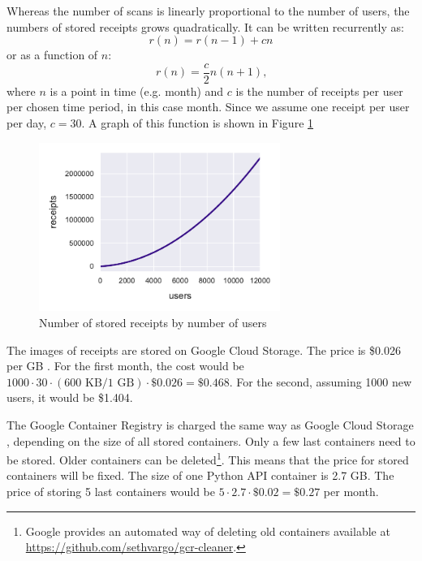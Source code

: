 \documentclass[
  digital, %
  table,   %
  oneside, %
  lof,     %
  lot,     %
]{fithesis3}
\begin{document}
Whereas the number of scans is linearly proportional to the number of users, the numbers of stored receipts grows quadratically. It can be written recurrently as: 
\begin{equation}
r(n) = r(n-1) + cn
\end{equation}
or as a function of $n$:
\begin{equation}
r(n) = \frac{c}{2}n(n + 1)\text{,}
\end{equation}
where $n$ is a point in time (e.g. month) and $c$ is the number of receipts per user per chosen time period, in this case month. Since we assume one receipt per user per day, $c = 30$. A graph of this function is shown in Figure \ref{fig:receipts_by_users}

\begin{figure}
    \begin{center}
        \includegraphics[width=0.7\textwidth]{figures/graphs/receipts_by_users}
    \end{center}
    \caption{Number of stored receipts by number of users}
    \label{fig:receipts_by_users}
\end{figure}

The images of receipts are stored on Google Cloud Storage. The price is \$0.026 per GB \cite{CloudStoragePricing}. For the first month, the cost would be $\num{1000}\cdot30\cdot(600\text{ KB} / 1\text{ GB})\cdot\$0.026 = \$0.468$.
For the second, assuming \num{1000} new users, it would be \$1.404.

The Google Container Registry is charged the same way as Google Cloud Storage \cite{ContainerRegistryPricing}, depending on the size of all stored containers. Only a few last containers need to be stored. Older containers can be deleted\footnote{Google provides an automated way of deleting old containers available at \url{https://github.com/sethvargo/gcr-cleaner}.}. This means that the price for stored containers will be fixed. The size of one Python API container is 2.7 GB. The price of storing 5 last containers would be $5\cdot2.7\cdot\$0.02 = \$0.27$ per month. 
\end{document}
